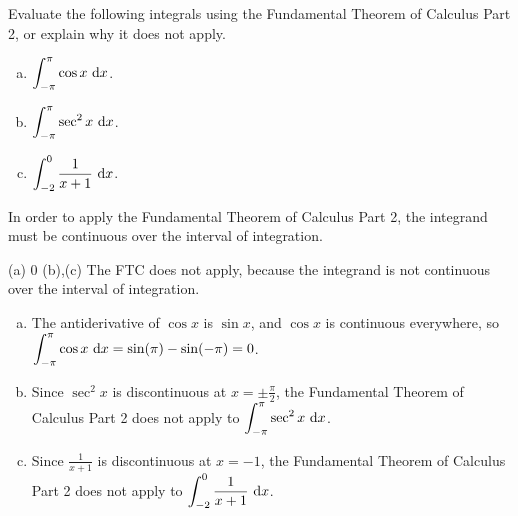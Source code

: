 \begin{question} Evaluate the following integrals using the Fundamental Theorem of Calculus Part 2, or explain why it does not apply.
\begin{enumerate}[(a)]
\item $\displaystyle\int_{-\pi}^\pi \cos x \ \dee{x}$.
\item $\displaystyle\int_{-\pi}^\pi \sec^2 x \ \dee{x}$.
\item $\displaystyle\int_{-2}^0 \frac{1}{x+1}\ \dee{x}$.
\end{enumerate}
\end{question}
\begin{hint}
In order to apply the Fundamental Theorem of Calculus Part 2, the integrand must be continuous over the interval of integration.
\end{hint}
\begin{answer}
(a) 0 \qquad (b),(c) The FTC does not apply, because the integrand is not continuous over the interval of integration.
\end{answer}
\begin{solution}
\begin{enumerate}[(a)]
\item The antiderivative of $\cos x$ is $\sin x$, and $\cos x$ is continuous everywhere, so
$\displaystyle\int_{-\pi}^\pi \cos x \ \mathrm{d}x = \sin(\pi)-\sin(-\pi) = 0$.

\item Since $\sec^2 x$ is discontinuous at $x=\pm\frac{\pi}{2}$, the Fundamental Theorem of Calculus Part 2 does not apply to $\displaystyle\int_{-\pi}^\pi \sec^2 x \ \dee{x}$.
\item Since $\frac{1}{x+1}$ is discontinuous at $x=-1$,  the Fundamental Theorem of Calculus Part 2 does not apply to $\displaystyle\int_{-2}^0 \frac{1}{x+1}\ \dee{x}$.
\end{enumerate}

\end{solution}

